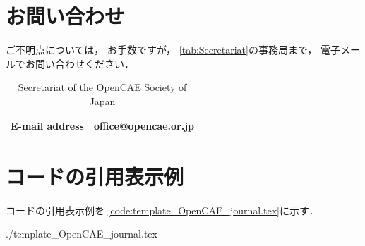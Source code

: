 \documentclass{../../style/ltjoc}
\begin{document}
\section{お問い合わせ}
ご不明点については，
お手数ですが，
\autoref{tab:Secretariat}の事務局まで，
電子メールでお問い合わせください．
\begin{table}[htbp]
  \centering
  \begin{tabular}{l|l}
    \hline
    E-mail address & office@opencae.or.jp\\
    \hline
    \end{tabular}
  \caption{Secretariat of the OpenCAE Society of Japan}
  \label{tab:Secretariat}
\end{table}

%
%
\clearpage
\appendix
\section{コードの引用表示例}
%
コードの引用表示例を
\autoref{code:template_OpenCAE_journal.tex}に示す．
%

{{./template_OpenCAE_journal.tex}}
%
\end{document}
